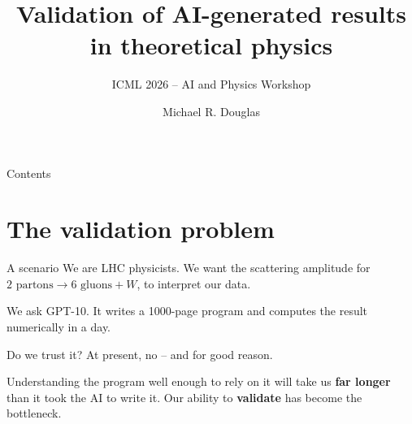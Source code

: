 \documentclass[aspectratio=169,xcolor=dvipsnames]{beamer}
\title[Validating AI in physics]{Validation of AI-generated results\\ in theoretical physics}
\subtitle{ICML 2026 -- AI and Physics Workshop}
\author[MRD]{Michael R. Douglas}
\institute[CMSA]{CMSA, Harvard University \;\&\; AletheAI}
\date{}
\def\p{\\[0.1in] \pause}
\begin{document}
\begin{frame}[plain]
  \titlepage
\end{frame}

\begin{frame}[plain]{Contents}
  \tableofcontents
\end{frame}

\section{The validation problem}
\begin{frame}{A scenario}
We are LHC physicists.  We want the scattering amplitude for
$2\text{ partons}\to 6\text{ gluons}+W$, to interpret our data. \p

We ask GPT-10.  It writes a 1000-page program and computes the result numerically
in a day. \p

Do we trust it?  At present, no -- and for good reason. \p

Understanding the program well enough to rely on it will take us {\bf far longer}
than it took the AI to write it.  Our ability to {\bf validate} has become the bottleneck.
\end{frame}
\end{document}
